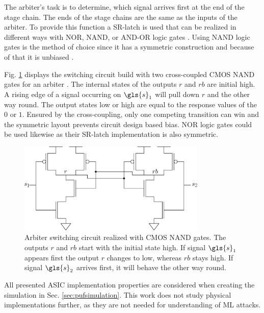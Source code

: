 The arbiter's task is to determine, which signal arrives first at the end of the stage chain.
The ends of the stage chains are the same as the inputs of the arbiter. %
To provide this function a \ac{SR-latch} is used that can be realized in different ways with NOR, NAND, or AND-OR logic gates \cite{2016Flip-flopWikipedia}.
Using NAND logic gates is the method of choice since it has a symmetric construction and because of that it is unbiased \cite{Lin2010Low-powerFunctions,Maes2013PhysicallyApplications}.

Fig. \ref{fig:nandarbiter} displays the switching circuit build with two cross-coupled \ac{CMOS} NAND gates for an arbiter \cite{2016NANDWikipedia}.
The internal states of the outputs $r$ and $rb$ are initial high. 
A rising edge of a signal occurring on $\gls{s}_1$ will pull down $r$ and the other way round.
The output states low or high are equal to the response values of the \puf $0$ or $1$. %
Ensured by the cross-coupling, only one competing transition can win and the symmetric layout prevents circuit design based bias.
NOR logic gates could be used likewise as their \ac{SR-latch} implementation is also symmetric.

\begin{figure}[ht]
\centering
\includegraphics[width=0.80\textwidth]{images/arbiter_circuit.eps}
\caption[Arbiter circuit]{Arbiter switching circuit realized with \ac{CMOS} NAND gates. The outputs $r$ and $rb$ start with the initial state high. If signal $\gls{s}_1$ appears first the output $r$ changes to low, whereas $rb$ stays high. If signal $\gls{s}_2$ arrives first, it will behave the other way round.}
\label{fig:nandarbiter}
\end{figure}

All presented \apuf \ac{ASIC} implementation properties are considered when creating the \apuf simulation in Sec. \ref{sec:pufsimulation}.
This work does not study physical \apuf implementations further, as they are not needed for understanding of \ac{ML} attacks.

